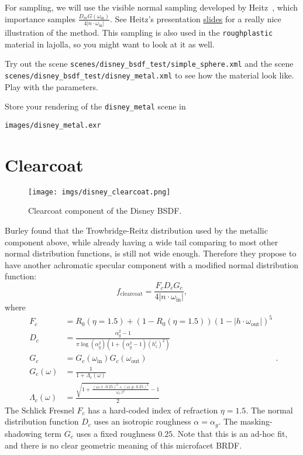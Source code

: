 For sampling, we will use the visible normal sampling developed by Heitz~\cite{Heitz:2018:SGD}, which importance samples $\frac{D_m G(\omega_{\text{in}})}{4 |n \cdot \omega_{\text{in}}|}$. See Heitz's presentation \href{https://jcgt.org/published/0007/04/01/slides.pdf}{slides} for a really nice illustration of the method. This sampling is also used in the \lstinline{roughplastic} material in lajolla, so you might want to look at it as well.

Try out the scene \lstinline{scenes/disney_bsdf_test/simple_sphere.xml} and the scene \\ \lstinline{scenes/disney_bsdf_test/disney_metal.xml} to see how the material look like. Play with the parameters.

Store your rendering of the \lstinline{disney_metal} scene in
\begin{lstlisting}
images/disney_metal.exr
\end{lstlisting}

\section{Clearcoat}
\begin{figure}
	\centering
	\texttt{[image: imgs/disney\_clearcoat.png]}
	\caption{Clearcoat component of the Disney BSDF.}
\end{figure}

Burley found that the Trowbridge-Reitz distribution used by the metallic component above, while already having a wide tail comparing to most other normal distribution functions, is still not wide enough. Therefore they propose to have another achromatic specular component with a modified normal distribution function:
\begin{equation}
f_{\text{clearcoat}} = \frac{F_c D_c G_c}{4 |n \cdot \omega_{\text{in}}|},
\label{eq:f_clearcoat}
\end{equation}
where
\begin{equation}
\begin{aligned}
F_c &= R_0(\eta = 1.5) + (1 - R_0(\eta = 1.5)) \left(1 - |h \cdot \omega_{\text{out}}|\right)^5 \\
D_c &= \frac{\alpha_g^2 - 1}{\pi \log(\alpha_g^2) \left( 1 + (\alpha_g^2 - 1) \left(h^l_z\right)^2 \right)} \\
G_c &= G_{c}(\omega_{\text{in}}) G_{c}(\omega_{\text{out}}) \\
G_{c}(\omega) &= \frac{1}{1 + \Lambda_c(\omega)} \\
\Lambda_c(\omega) &= \frac{\sqrt{1 + \frac{\left(\omega_l.x \cdot 0.25\right)^2 + \left(\omega_l.y \cdot 0.25\right)^2}{\omega_l.z^2}} - 1}{2}
\end{aligned}.
\end{equation}
The Schlick Fresnel $F_c$ has a hard-coded index of refraction $\eta = 1.5$. The normal distribution function $D_c$ uses an isotropic roughness $\alpha = \alpha_g$. The masking-shadowing term $G_c$ uses a fixed roughness $0.25$. Note that this is an ad-hoc fit, and there is no clear geometric meaning of this microfacet BRDF.

